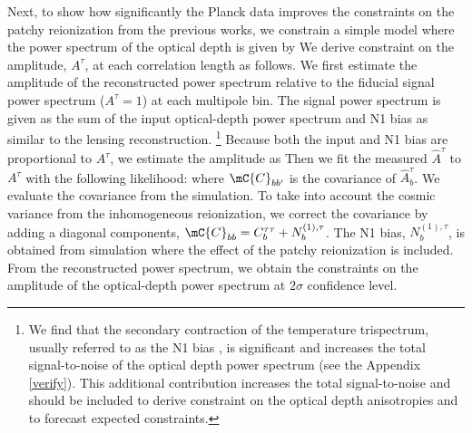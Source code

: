 \documentclass[aps,prd,twocolumn,superscriptaddress,groupedaddress,nofootinbib]{revtex4}
\def\hA{\widehat{A}}
\begin{document}
Next, to show how significantly the Planck data improves the constraints on the patchy reionization 
from the previous works, 
we constrain a simple model where the power spectrum of the optical depth is 
given by \cite{Gluscevic:2012qv}
We derive constraint on the amplitude, $A^\tau$, at each correlation length as follows.
We first estimate the amplitude of the reconstructed power spectrum relative to the fiducial 
signal power spectrum ($A^\tau=1$) at each multipole bin.
The signal power spectrum is given as the sum of the input optical-depth power spectrum and N1 bias 
as similar to the lensing reconstruction. 
\footnote{
We find that the secondary contraction of the temperature trispectrum, 
usually referred to as the N1 bias \cite{Kesden:2003cc,Namikawa:2016d}, 
is significant and increases the total signal-to-noise of the optical depth power spectrum 
(see the Appendix \ref{verify}).
This additional contribution increases the total signal-to-noise and 
should be included to derive constraint on the optical depth anisotropies and 
to forecast expected constraints. 
}
Because both the input and N1 bias are proportional to $A^\tau$, we estimate the amplitude as
\al{
	\hA^\tau_b = \frac{\hC_b^{\tau\tau}}{(C_b^{\tau\tau}+N_b^{(1),\tau})|_{A^\tau=1}}
	\,.
}
Then we fit the measured $\hA^\tau$ to $A^\tau$ with the following likelihood:
\al{
	-2\ln\mC{L}(A^\tau) &= \ln\det(\mC{C}(A^\tau)) 
		\notag \\
		&+ \sum_{bb'} (\hA^\tau_b-A^\tau)\mC{C}^{-1}_{bb'}(A^\tau) (\hA^\tau_{b'}-A^\tau)
	\,.
}
where $\mC{C}_{bb'}$ is the covariance of $\hA^\tau_b$. 
We evaluate the covariance from the simulation. 
To take into account the cosmic variance from the inhomogeneous reionization, 
we correct the covariance by adding a diagonal components, $\mC{C}_{bb}=C_b^{\tau\tau}+N_b^{(1),\tau}$. 
The N1 bias, $N_b^{(1),\tau}$, is obtained from simulation where the effect of the patchy reionization is included. 
From the reconstructed power spectrum, we obtain the constraints on the amplitude of the optical-depth 
power spectrum at $2\sigma$ confidence level.
\end{document}
